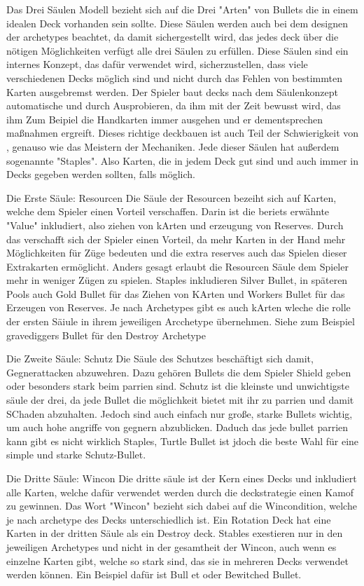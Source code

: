 Das Drei Säulen Modell bezieht sich auf die Drei "Arten" von Bullets die in einem idealen Deck vorhanden sein sollte.
Diese Säulen werden auch bei dem designen der archetypes beachtet, da damit sichergestellt wird, das jedes deck über
die nötigen Möglichkeiten verfügt alle drei Säulen zu erfüllen.
Diese Säulen sind ein internes Konzept, das dafür verwendet wird, sicherzustellen, dass viele verschiedenen Decks möglich sind
und nicht durch das Fehlen von bestimmten Karten ausgebremst werden.
Der Spieler baut decks nach dem Säulenkonzept automatische und durch Ausprobieren, da ihm mit der Zeit bewusst wird, das
ihm Zum Beipiel die Handkarten immer ausgehen und er dementsprechen maßnahmen ergreift. Dieses richtige deckbauen ist auch Teil der
Schwierigkeit von \FF, genauso wie das Meistern der Mechaniken.
Jede dieser Säulen hat außerdem sogenannte "Staples". Also Karten, die in jedem Deck gut sind und auch immer in Decks gegeben werden sollten, falls möglich.


Die Erste Säule: Resourcen
Die Säule der Resourcen bezeiht sich auf Karten, welche dem Spieler einen Vorteil verschaffen. Darin ist die beriets
erwähnte "Value" inkludiert, also ziehen von kArten und erzeugung von Reserves. Durch das verschafft sich der Spieler einen Vorteil,
da mehr Karten in der Hand mehr Möglichkeiten für Züge bedeuten und die extra reserves auch das Spielen dieser Extrakarten ermöglicht.
Anders gesagt erlaubt die Resourcen Säule dem Spieler mehr in weniger Zügen zu spielen.
Staples inkludieren Silver Bullet, in späteren Pools auch Gold Bullet für das Ziehen von KArten und Workers Bullet für das Erzeugen von Reserves.
Je nach Archetypes gibt es auch kArten wleche die rolle der ersten Säiule in ihrem jeweiligen Arcchetype übernehmen.
Siehe zum Beispiel gravediggers Bullet für den Destroy Archetype


Die Zweite Säule: Schutz
Die Säule des Schutzes beschäftigt sich damit, Gegnerattacken abzuwehren. Dazu gehören Bullets die dem Spieler Shield
geben oder besonders stark beim parrien sind. Schutz ist die kleinste und unwichtigste säule der drei, da jede Bullet
die möglichkeit bietet mit ihr zu parrien und damit SChaden abzuhalten. Jedoch sind auch einfach nur große, starke Bullets
wichtig, um auch hohe angriffe von gegnern abzublicken. Daduch das jede bullet parrien kann gibt es nicht wirklich Staples,
Turtle Bullet ist jdoch die beste Wahl für eine simple und starke Schutz-Bullet.


Die Dritte Säule: Wincon
Die dritte säule ist der Kern eines Decks und inkludiert alle Karten, welche dafür verwendet werden durch die deckstrategie einen Kamof zu gewinnen.
Das Wort "Wincon" bezieht sich dabei auf die Wincondition, welche je nach archetype des Decks unterschiedlich ist.
Ein Rotation Deck hat eine Karten in der dritten Säule als ein Destroy deck. Stables exestieren nur in den jeweiligen Archetypes
und nicht in der gesamtheit der Wincon, auch wenn es einzelne Karten gibt, welche so stark sind, das sie in mehreren Decks verwendet werden können.
Ein Beispiel dafür ist Bull et oder Bewitched Bullet.



